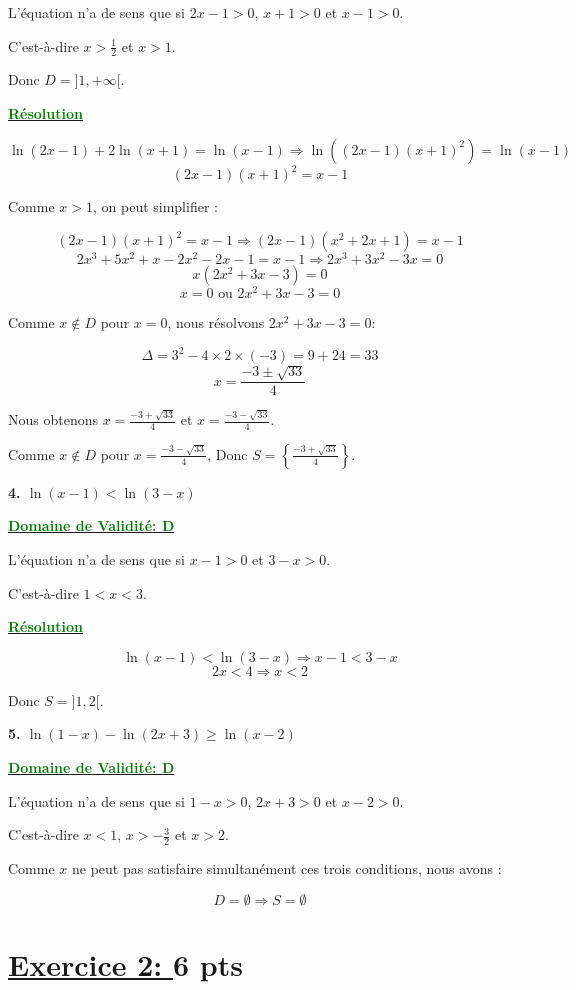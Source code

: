 \documentclass[12pt]{article}
\begin{document}
L'équation n'a de sens que si \(2x-1>0\), \(x+1>0\) et \(x-1>0\).

C'est-à-dire \(x>\frac{1}{2}\) et \(x>1\).

Donc \(D = ]1, +\infty[\).

\textbf{\underline{\textcolor{green}{Résolution}}}

\[
\ln(2x-1)+2\ln(x+1)=\ln(x-1)\Longrightarrow \ln((2x-1)(x+1)^2)=\ln(x-1)
\]
\[
(2x-1)(x+1)^2=x-1
\]

Comme \(x > 1\), on peut simplifier :

\[
(2x-1)(x+1)^2=x-1 \Longrightarrow (2x-1)(x^2 + 2x + 1)=x-1
\]
\[
2x^3 + 5x^2 + x - 2x^2 - 2x - 1 = x - 1 \Longrightarrow 2x^3 + 3x^2 - 3x = 0
\]
\[
x(2x^2 + 3x - 3) = 0
\]
\[
x=0 \text{ ou } 2x^2 + 3x - 3 = 0
\]

Comme \(x \notin D\) pour \(x=0\), nous résolvons \(2x^2 + 3x - 3 = 0\):

\[
\Delta = 3^2 - 4 \times 2 \times (-3) = 9 + 24 = 33
\]
\[
x = \frac{-3 \pm \sqrt{33}}{4}
\]

Nous obtenons \(x = \frac{-3 + \sqrt{33}}{4}\) et \(x = \frac{-3 - \sqrt{33}}{4}\).

Comme \(x \notin D\) pour \(x = \frac{-3 - \sqrt{33}}{4}\), Donc \(S = \left\{\frac{-3 + \sqrt{33}}{4}\right\}\).

\textbf{4. \(\ln(x-1)<\ln(3-x)\)}

\textbf{\underline{\textcolor{green}{Domaine de Validité: D}}}

L'équation n'a de sens que si \(x-1>0\) et \(3-x>0\).

C'est-à-dire \(1<x<3\).

\textbf{\underline{\textcolor{green}{Résolution}}}

\[
\ln(x-1)<\ln(3-x)\Longrightarrow x-1<3-x
\]
\[
2x<4\Longrightarrow x<2
\]

Donc \(S=]1,2[\).

\textbf{5. \(\ln(1-x)-\ln(2x+3)\geq\ln(x-2)\)}

\textbf{\underline{\textcolor{green}{Domaine de Validité: D}}}

L'équation n'a de sens que si \(1-x>0\), \(2x+3>0\) et \(x-2>0\).

C'est-à-dire \(x<1\), \(x>-\frac{3}{2}\) et \(x>2\).

Comme \(x\) ne peut pas satisfaire simultanément ces trois conditions, nous avons :

\[
D = \emptyset \Longrightarrow S = \emptyset
\]

\section*{\underline{Exercice 2: }\textbf{6 pts}}
\end{document}
